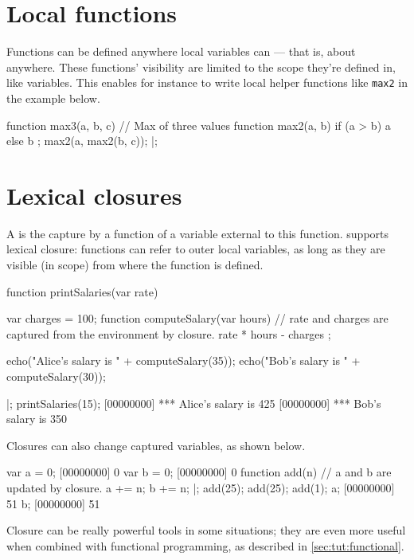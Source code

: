 \section{Local functions}

Functions can be defined anywhere local variables can --- that is, about
anywhere. These functions' visibility are limited to the scope they're
defined in, like variables. This enables for instance to write local helper
functions like \lstinline{max2} in the example below.

\begin{urbiscript}
function max3(a, b, c) // Max of three values
{
  function max2(a, b)
  {
    if (a > b)
      a
    else
      b
  };
  max2(a, max2(b, c));
}|;
\end{urbiscript}

\section{Lexical closures}

A  is the capture by a function of a variable external to this
function. \us supports lexical closure: functions can refer to outer
local variables, as long as they are visible (in scope) from where
the function is defined.

\begin{urbiscript}
function printSalaries(var rate)
{
  var charges = 100;
  function computeSalary(var hours)
  {
    // rate and charges are captured from the environment by closure.
    rate * hours - charges
  };

  echo("Alice's salary is " + computeSalary(35));
  echo("Bob's salary is " + computeSalary(30));
}|;
printSalaries(15);
[00000000] *** Alice's salary is 425
[00000000] *** Bob's salary is 350
\end{urbiscript}

Closures can also change captured variables, as shown below.

\begin{urbiscript}
var a = 0;
[00000000] 0
var b = 0;
[00000000] 0
function add(n)
{
  // a and b are updated by closure.
  a += n;
  b += n;
  {}
}|;
add(25);
add(25);
add(1);
a;
[00000000] 51
b;
[00000000] 51
\end{urbiscript}

Closure can be really powerful tools in some situations; they are even more
useful when combined with functional programming, as described in
\autoref{sec:tut:functional}.




